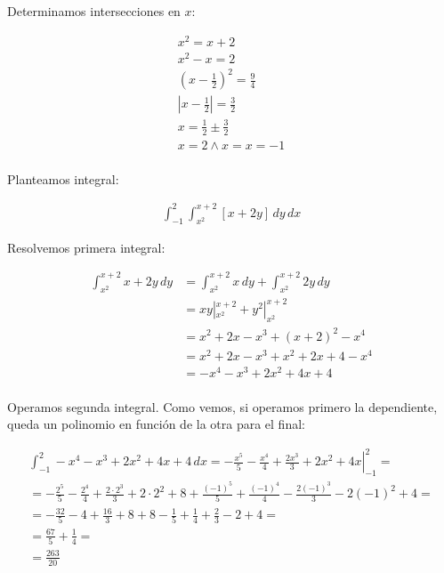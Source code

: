 Determinamos intersecciones en \(x\):

\begin{align*}
    x^{2} = x + 2                     \\
    x^{2} - x = 2                     \\
    (x-\frac{1}{2})^{2} = \frac{9}{4} \\
    |x-\frac{1}{2}| = \frac{3}{2}     \\
    x = \frac{1}{2} \pm \frac{3}{2}   \\
    x = 2 \land x = x = -1            \\
\end{align*}

Planteamos integral:

\begin{align*}
    \int_{-1}^{2} \int_{x^{2}}^{x+2}[ x + 2y ]\,dy \,dx
\end{align*}

Resolvemos primera integral:

\begin{align*}
    \int_{x^{2}}^{x+2} x + 2y \,dy & = \int_{x^{2}}^{x+2} x \,dy + \int_{x^{2}}^{x+2} 2y \,dy \\
                                   & = xy|_{x^{2}}^{x+2} + y^{2}|_{x^{2}}^{x+2}               \\
                                   & = x^{2} + 2x - x^{3} + (x+2)^{2} - x^{4}                 \\
                                   & = x^{2} + 2x - x^{3} + x^{2} + 2x + 4 - x^{4}            \\
                                   & = -x^{4} - x^{3} + 2x^{2} + 4x + 4                       \\
\end{align*}

Operamos segunda integral.
Como vemos, si operamos primero la dependiente,
queda un polinomio en función de la otra para el final:

\begin{gather*}
    \int_{-1}^{2} -x^{4} - x^{3} + 2x^{2} + 4x + 4 \,dx = \left.-\frac{x^{5}}{5} - \frac{x^{4}}{4} + \frac{2x^{3}}{3} + 2x^{2} + 4x\right|_{-1}^{2} = \\
    = -\frac{2^{5}}{5} - \frac{2^{4}}{4} + \frac{2\cdot2^{3}}{3} + 2\cdot2^{2} + 8 + \frac{(-1)^{5}}{5} + \frac{(-1)^{4}}{4} - \frac{2(-1)^{3}}{3} - 2(-1)^{2} + 4 = \\
    = -\frac{32}{5} - 4 + \frac{16}{3} + 8 + 8 - \frac{1}{5} + \frac{1}{4} + \frac{2}{3} - 2 + 4 = \\
    = \frac{67}{5} + \frac{1}{4} = \\
    = \boxed{\frac{263}{20}} \\
\end{gather*}

